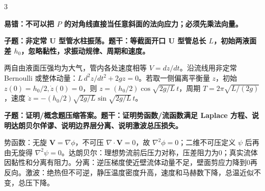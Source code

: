 \documentclass[a4paper]{article}
\newcommand{\qt}[1]{\vspace{0.10pt}\colorbox{Q}{\parbox{\dimexpr\linewidth-2\fboxsep}{\color{white}\bfseries #1}}\par}
\newcommand{\ans}[1]{\colorbox{G}{\parbox{\dimexpr\linewidth-2\fboxsep}{#1}}\par}
\newcommand{\warn}[1]{\colorbox{Y}{\parbox{\dimexpr\linewidth-2\fboxsep}{\color{E}\bfseries #1}}\par}
\begin{document}
\begin{multicols}{3}
\warn{易错：不可以把 $P$ 的对角线直接当任意斜面的法向应力；必须先乘法向量。}
\qt{子题：非定常 U 型管水柱振荡。题干：等截面开口 U 型管总长 $L$，初始两液面差 $h_0$，忽略黏性，求振动规律、周期和速度。}
\ans{两自由液面压强均为大气，管内各处速度相等 $V=dz/dt$。沿流线用非定常 Bernoulli 或整体动量：$L\,d^2z/dt^2+2gz=0$。若取一侧偏离平衡量 $z$，初始 $z(0)=h_0/2,\dot z(0)=0$，则 $z=(h_0/2)\cos\sqrt{2g/L}\,t$，周期 $T=2\pi\sqrt{L/(2g)}$，速度 $\dot z=-(h_0/2)\sqrt{2g/L}\sin\sqrt{2g/L}\,t$。}
\qt{子题：证明/概念题压缩答案。题干：证明势函数/流函数满足 Laplace 方程、说明达朗贝尔佯谬、说明边界层分离、说明激波总压损失。}
\ans{势函数：无旋 $\bm V=\nabla\phi$，不可压 $\nabla\cdot\bm V=0$，故 $\nabla^2\phi=0$；二维不可压定义 $\psi$ 后再由无旋得 $\nabla^2\psi=0$。达朗贝尔：理想势流前后压力对称，压差阻力为0；真实流体因黏性和分离有阻力。分离：逆压梯度使近壁流体动量不足，壁面剪应力降到0再反向。激波：绝热但不可逆，静压温度密度升高，速度和马赫数下降，总温近似不变，总压下降。}


\end{multicols}
\end{document}
